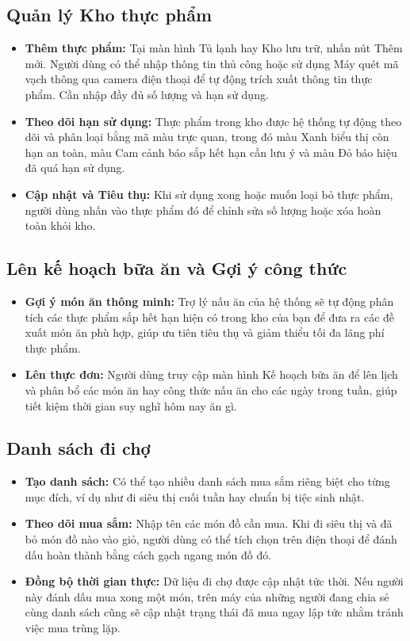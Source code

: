 \documentclass[../main.tex]{subfiles}
\begin{document}
\subsection{Quản lý Kho thực phẩm}
\begin{itemize}
    \item \textbf{Thêm thực phẩm:} Tại màn hình Tủ lạnh hay Kho lưu trữ, nhấn nút Thêm mới. Người dùng có thể nhập thông tin thủ công hoặc sử dụng Máy quét mã vạch thông qua camera điện thoại để tự động trích xuất thông tin thực phẩm. Cần nhập đầy đủ số lượng và hạn sử dụng.
    \item \textbf{Theo dõi hạn sử dụng:} Thực phẩm trong kho được hệ thống tự động theo dõi và phân loại bằng mã màu trực quan, trong đó màu Xanh biểu thị còn hạn an toàn, màu Cam cảnh báo sắp hết hạn cần lưu ý và màu Đỏ báo hiệu đã quá hạn sử dụng.
    \item \textbf{Cập nhật và Tiêu thụ:} Khi sử dụng xong hoặc muốn loại bỏ thực phẩm, người dùng nhấn vào thực phẩm đó để chỉnh sửa số lượng hoặc xóa hoàn toàn khỏi kho.
\end{itemize}

\subsection{Lên kế hoạch bữa ăn và Gợi ý công thức}
\begin{itemize}
    \item \textbf{Gợi ý món ăn thông minh:} Trợ lý nấu ăn của hệ thống sẽ tự động phân tích các thực phẩm sắp hết hạn hiện có trong kho của bạn để đưa ra các đề xuất món ăn phù hợp, giúp ưu tiên tiêu thụ và giảm thiểu tối đa lãng phí thực phẩm.
    \item \textbf{Lên thực đơn:} Người dùng truy cập màn hình Kế hoạch bữa ăn để lên lịch và phân bổ các món ăn hay công thức nấu ăn cho các ngày trong tuần, giúp tiết kiệm thời gian suy nghĩ hôm nay ăn gì.
\end{itemize}

\subsection{Danh sách đi chợ}
\begin{itemize}
    \item \textbf{Tạo danh sách:} Có thể tạo nhiều danh sách mua sắm riêng biệt cho từng mục đích, ví dụ như đi siêu thị cuối tuần hay chuẩn bị tiệc sinh nhật.
    \item \textbf{Theo dõi mua sắm:} Nhập tên các món đồ cần mua. Khi đi siêu thị và đã bỏ món đồ nào vào giỏ, người dùng có thể tích chọn trên điện thoại để đánh dấu hoàn thành bằng cách gạch ngang món đồ đó.
    \item \textbf{Đồng bộ thời gian thực:} Dữ liệu đi chợ được cập nhật tức thời. Nếu người này đánh dấu mua xong một món, trên máy của những người đang chia sẻ cùng danh sách cũng sẽ cập nhật trạng thái đã mua ngay lập tức nhằm tránh việc mua trùng lặp.
\end{itemize}
\end{document}
